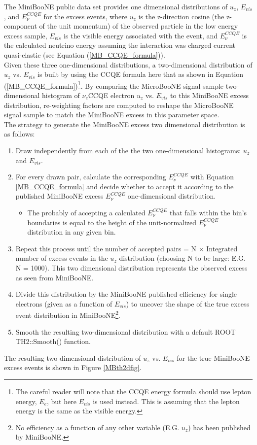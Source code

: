 The MiniBooNE public data set \cite{MB_lee_datarelease} provides one dimensional distributions of $u_z$, $E_{vis}$, and $E_\nu^{CCQE}$ for the excess events, where $u_z$ is the z-direction cosine (the z- component of the unit momentum) of the observed particle in the low energy excess sample, $E_{vis}$ is the visible energy associated with the event, and $E_{\nu}^{CCQE}$ is the calculated neutrino energy assuming the interaction was charged current quasi-elastic (see Equation (\ref{MB_CCQE_formula})).\\

Given these three one-dimensional distributions, a two-dimensional distribution of $u_z$ vs. $E_{vis}$ is built by using the CCQE formula here that as shown in Equation (\ref{MB_CCQE_formula})\footnote{The careful reader will note that the CCQE energy formula should use lepton energy, $E_e$, but here $E_{vis}$ is used instead. This is assuming that the lepton energy is the same as the visible energy.}. By comparing the MicroBooNE signal sample two-dimensional histogram of $\nu_e$CCQE electron $u_z$ vs. $E_{vis}$ to this MiniBooNE excess distribution, re-weighting factors are computed to reshape the MicroBooNE signal sample to match the MiniBooNE excess in this parameter space.\\

The strategy to generate the MiniBooNE excess two dimensional distribution is as follows:
\begin{enumerate}
\item Draw independently from each of the the two one-dimensional histograms: $u_z$ and $E_{vis}$.
\item For every drawn pair, calculate the corresponding $E_\nu^{CCQE}$ with Equation \ref{MB_CCQE_formula} and decide whether to accept it according to the published MiniBooNE excess $E_\nu^{CCQE}$ one-dimensional distribution.
	\begin{itemize}
	\item The probably of accepting a calculated $E_\nu^{CCQE}$ that falls within the bin's boundaries is equal to the height of the unit-normalized $E_\nu^{CCQE}$ distribution in any given bin.
	\end{itemize}
\item Repeat this process until the number of accepted pairs = N $\times$ Integrated number of excess events in the $u_z$ distribution (choosing N to be large: E.G. N = 1000). This two dimensional distribution represents the observed excess as seen from MiniBooNE.
\item Divide this distribution by the MiniBooNE published efficiency for single electrons (given as a function of $E_{vis}$) to uncover the shape of the true excess event distribution in MiniBooNE\footnote{No efficiency as a function of any other variable (E.G. $u_z$) has been published by MiniBooNE.}.
\item Smooth the resulting two-dimensional distribution with a default ROOT TH2::Smooth() function.
\end{enumerate}
The resulting two-dimensional distribution of $u_z$ vs. $E_{vis}$ for the true MiniBooNE excess events is shown in Figure \ref{MBth2dfig}.


